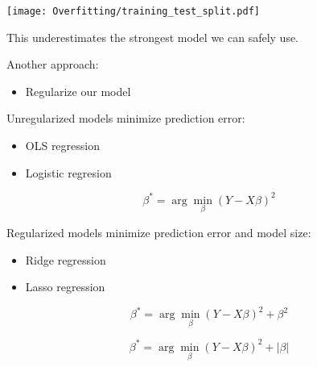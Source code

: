 \documentclass[xcolor=pdftex,dvipsnames,table]{beamer}
\begin{document}
\frame
{
	\begin{center}
		\texttt{[image: Overfitting/training\_test\_split.pdf]}
	\end{center}
}

\frame
{
	This underestimates the strongest model we can safely use.
}

\frame
{
	Another approach:
	\begin{itemize}
		\item{Regularize our model}
	\end{itemize}
}

\frame
{
	Unregularized models minimize prediction error:
	\begin{itemize}
		\item{OLS regression}
		\item{Logistic regresion}
	\end{itemize}
}

\frame
{
	\[
		\beta ^ {*} =  \arg \min_{\beta} (Y - X \beta) ^ 2
	\]
}

\frame
{
	Regularized models minimize prediction error and model size:
	\begin{itemize}
		\item{Ridge regression}
		\item{Lasso regression}
	\end{itemize}
}

\frame
{
	\[
		\beta ^ {*} =  \arg \min_{\beta} (Y - X \beta) ^ 2 + \beta ^ 2
	\]
}

\frame
{
	\[
		\beta ^ {*} =  \arg \min_{\beta} (Y - X \beta) ^ 2 + |\beta|
	\]
}
\end{document}
